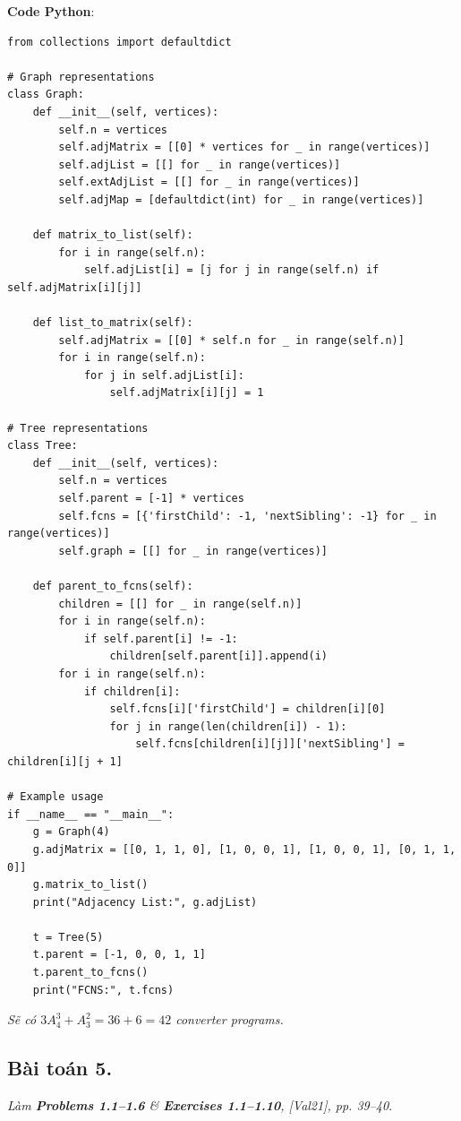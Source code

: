 \documentclass[a4paper,12pt]{article}
\begin{document}
\textbf{Code Python}:
\lstset{language=Python}
\begin{lstlisting}
from collections import defaultdict

# Graph representations
class Graph:
    def __init__(self, vertices):
        self.n = vertices
        self.adjMatrix = [[0] * vertices for _ in range(vertices)]
        self.adjList = [[] for _ in range(vertices)]
        self.extAdjList = [[] for _ in range(vertices)]
        self.adjMap = [defaultdict(int) for _ in range(vertices)]

    def matrix_to_list(self):
        for i in range(self.n):
            self.adjList[i] = [j for j in range(self.n) if self.adjMatrix[i][j]]

    def list_to_matrix(self):
        self.adjMatrix = [[0] * self.n for _ in range(self.n)]
        for i in range(self.n):
            for j in self.adjList[i]:
                self.adjMatrix[i][j] = 1

# Tree representations
class Tree:
    def __init__(self, vertices):
        self.n = vertices
        self.parent = [-1] * vertices
        self.fcns = [{'firstChild': -1, 'nextSibling': -1} for _ in range(vertices)]
        self.graph = [[] for _ in range(vertices)]

    def parent_to_fcns(self):
        children = [[] for _ in range(self.n)]
        for i in range(self.n):
            if self.parent[i] != -1:
                children[self.parent[i]].append(i)
        for i in range(self.n):
            if children[i]:
                self.fcns[i]['firstChild'] = children[i][0]
                for j in range(len(children[i]) - 1):
                    self.fcns[children[i][j]]['nextSibling'] = children[i][j + 1]

# Example usage
if __name__ == "__main__":
    g = Graph(4)
    g.adjMatrix = [[0, 1, 1, 0], [1, 0, 0, 1], [1, 0, 0, 1], [0, 1, 1, 0]]
    g.matrix_to_list()
    print("Adjacency List:", g.adjList)

    t = Tree(5)
    t.parent = [-1, 0, 0, 1, 1]
    t.parent_to_fcns()
    print("FCNS:", t.fcns)
\end{lstlisting}

\textit{Sẽ có $3A_4^3 + A_3^2 = 36 + 6 = 42$ converter programs.}

\subsection{Bài toán 5.} \textit{Làm \textbf{Problems 1.1–1.6} \& \textbf{Exercises 1.1–1.10}, [Val21], pp. 39–40}. 
\end{document}
